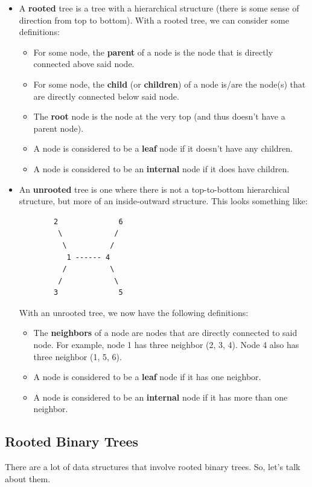 \documentclass[letterpaper]{article}
\begin{document}
\begin{itemize}
    \item A \textbf{rooted} tree is a tree with a hierarchical structure (there is some sense of direction from top to bottom). With a rooted tree, we can consider some definitions:
    \begin{itemize}
        \item For some node, the \textbf{parent} of a node is the node that is directly connected above said node. 
        \item For some node, the \textbf{child} (or \textbf{children}) of a node is/are the node(s) that are directly connected below said node.
        \item The \textbf{root} node is the node at the very top (and thus doesn't have a parent node). 
        \item A node is considered to be a \textbf{leaf} node if it doesn't have any children. 
        \item A node is considered to be an \textbf{internal} node if it does have children. 
    \end{itemize}

    \item An \textbf{unrooted} tree is one where there is not a top-to-bottom hierarchical structure, but more of an inside-outward structure. This looks something like: 
    \begin{verbatim}
        2              6
         \            /
          \          /
           1 ------ 4
          /          \ 
         /            \ 
        3              5
    \end{verbatim}
    With an unrooted tree, we now have the following definitions:
    \begin{itemize}
        \item The \textbf{neighbors} of a node are nodes that are directly connected to said node. For example, node 1 has three neighbor (2, 3, 4). Node 4 also has three neighbor (1, 5, 6).
        \item A node is considered to be a \textbf{leaf} node if it has one neighbor. 
        \item A node is considered to be an \textbf{internal} node if it has more than one neighbor. 
    \end{itemize}
\end{itemize}

\subsection{Rooted Binary Trees}
There are a lot of data structures that involve rooted binary trees. So, let's talk about them. 
\end{document}
